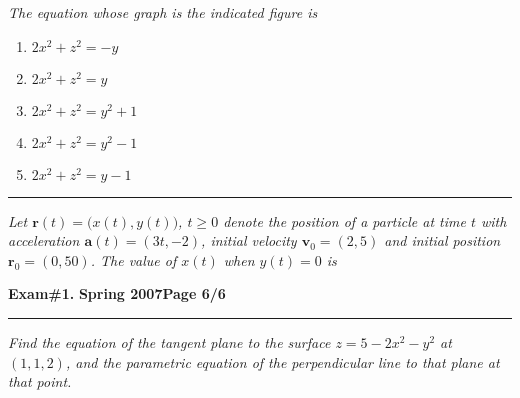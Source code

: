 \documentclass[12pt]{article}
\begin{document}
\bigskip
{\problem[10 pts] \em The equation whose graph is the indicated figure
is}
\begin{enumerate}
\item $2x^2 + z^2 = -y$
\item $2x^2 + z^2 = y$
\item $2x^2 + z^2 = y^2+1$
\item $2x^2 + z^2 = y^2-1$
\item $2x^2 + z^2 = y-1$
\end{enumerate}
\vspace{2cm}
\hrule

{\problem[10 pts] \em Let $\mathbf{r}(t) = \big( x(t), y(t)
  \big)$, $t\geq 0$ denote the position of a particle at time $t$ with
  acceleration $\mathbf{a}(t) = (3t,-2)$, initial velocity
  $\mathbf{v}_0 = (2,5)$ and initial position $\mathbf{r}_0 =
  (0,50)$.  The value of $x(t)$ when $y(t)=0$ is}
\vspace{12cm}
\begin{flushright}
\end{flushright}
\newpage

\hfill{\large\bf Exam\#1.}\hfill{\large\bf
  Spring 2007}\hfill{\large\bf Page 6/6}\hrule

\bigskip
{\problem[12 pts] \em Find the equation of the tangent plane to the
  surface $z=5-2x^2-y^2$ at $(1,1,2)$, and the parametric equation of
  the perpendicular line to that plane at that point.}
\vspace{16cm}
\begin{flushright}
\end{flushright}
\end{document}
